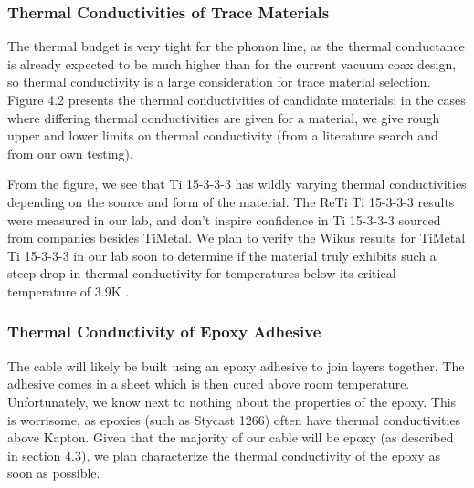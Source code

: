 \documentclass{report}
\begin{document}
\subsubsection{Thermal Conductivities of Trace Materials}

The thermal budget is very tight for the phonon line, as the thermal conductance is already expected to be much higher than for the current vacuum coax design, so thermal conductivity is a large consideration for trace material selection. Figure 4.2 presents the thermal conductivities of candidate materials; in the cases where differing thermal conductivities are given for a material, we give rough upper and lower limits on thermal conductivity (from a literature search and from our own testing).

From the figure, we see that Ti 15-3-3-3 has wildly varying thermal conductivities depending on the source and form of the material. The ReTi Ti 15-3-3-3 results were measured in our lab, and don't inspire confidence in Ti 15-3-3-3 sourced from companies besides TiMetal. We plan to verify the Wikus results for TiMetal Ti 15-3-3-3 in our lab soon to determine if the material truly exhibits such a steep drop in thermal conductivity for temperatures below its critical temperature of 3.9K \cite{wik}.

\subsubsection{Thermal Conductivity of Epoxy Adhesive}

The cable will likely be built using an epoxy adhesive to join layers together. The adhesive comes in a sheet which is then cured above room temperature. Unfortunately, we know next to nothing about the properties of the epoxy. This is worrisome, as epoxies (such as Stycast 1266) often have thermal conductivities above Kapton. Given that the majority of our cable will be epoxy (as described in section 4.3), we plan characterize the thermal conductivity of the epoxy as soon as possible.
\end{document}
